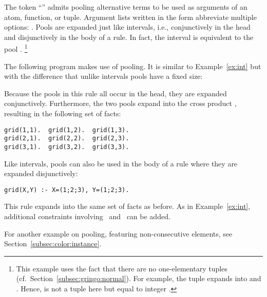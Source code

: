 The token ``\code{;}'' admits pooling alternative terms
to be used as arguments of an atom, function, or tuple. %
Argument lists written in the form  abbreviate multiple options:
.
Pools are expanded just like intervals, i.e.,
conjunctively in the head and disjunctively in the body of a rule.
In fact, the interval  is equivalent to the pool .%
\footnote{%
  This example uses the fact that there are no one-elementary tuples (cf.~Section~\ref{subsec:gringo:normal}).
For example, the tuple  expands into  and .
Hence,  is not a tuple here but equal to integer .}
\begin{example}\label{ex:pool}
The following program makes use of pooling.
It is similar to Example~\ref{ex:int}
but with the difference that unlike intervals pools have a fixed size:%

%
Because the pools in this rule all occur in the head,
they are expanded conjunctively.
Furthermore, the two pools expand into the cross product ,
resulting in the following set of facts:
\begin{lstlisting}[numbers=none]
grid(1,1).  grid(1,2).  grid(1,3).
grid(2,1).  grid(2,2).  grid(2,3).
grid(3,1).  grid(3,2).  grid(3,3).
\end{lstlisting}
Like intervals, pools can also be used in the body of a rule where they are expanded disjunctively:
\begin{lstlisting}
grid(X,Y) :- X=(1;2;3), Y=(1;2;3).
\end{lstlisting}
This rule expands into the same set of facts as before.
As in Example~\ref{ex:int}, additional constraints involving~ and~ can be added.
\eexample
\end{example}

For another example on pooling, featuring non-consecutive elements, see Section~\ref{subsec:color:instance}.

